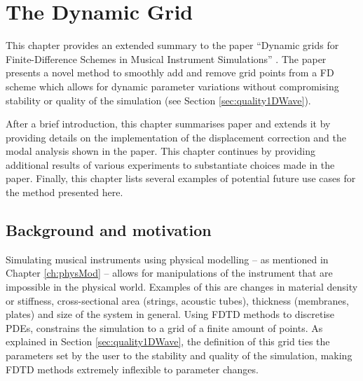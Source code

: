 \chapter{The Dynamic Grid}\label{ch:dynamicGrid}
This chapter provides an extended summary to the paper ``Dynamic grids for Finite-Difference Schemes in Musical Instrument Simulations'' \citeP[G]. The paper presents a novel method to smoothly add and remove grid points from a FD scheme which allows for dynamic parameter variations without compromising stability or quality of the simulation (see Section \ref{sec:quality1DWave}). 

After a brief introduction, this chapter summarises paper \citeP[G] and extends it by providing details on the implementation of the displacement correction and the modal analysis shown in the paper. This chapter continues by providing additional results of various experiments to substantiate choices made in the paper. Finally, this chapter lists several examples of potential future use cases for the method presented here. 

\section{Background and motivation}
Simulating musical instruments using physical modelling -- as mentioned in Chapter \ref{ch:physMod} -- allows for manipulations of the instrument that are impossible in the physical world. Examples of this are changes in material density or stiffness, cross-sectional area (strings, acoustic tubes), thickness (membranes, plates) and size of the system in general. Using FDTD methods to discretise PDEs, constrains the simulation to a grid of a finite amount of points. As explained in Section \ref{sec:quality1DWave}, the definition of this grid ties the parameters set by the user to the stability and quality of the simulation, making FDTD methods extremely inflexible to parameter changes. 

